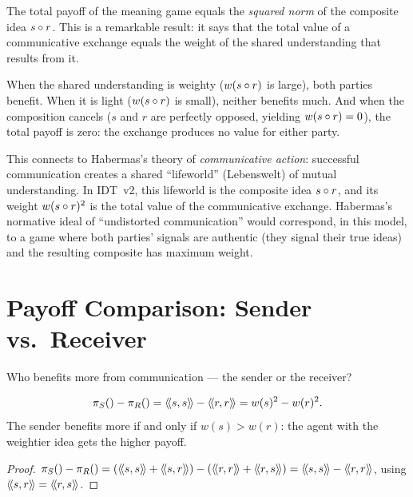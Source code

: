 \begin{interpretation}
\label{interp:total}
The total payoff of the meaning game equals the \emph{squared norm} of the
composite idea $s \circ r$. This is a remarkable result: it says that the
total value of a communicative exchange equals the weight of the shared
understanding that results from it.

When the shared understanding is weighty ($w(s \circ r)$ is large), both
parties benefit. When it is light ($w(s \circ r)$ is small), neither benefits
much. And when the composition cancels ($s$ and $r$ are perfectly opposed,
yielding $w(s \circ r) = 0$), the total payoff is zero: the exchange
produces no value for either party.

This connects to Habermas's theory of \emph{communicative action}: successful
communication creates a shared ``lifeworld'' (Lebenswelt) of mutual
understanding. In IDT~v2, this lifeworld is the composite idea $s \circ r$,
and its weight $w(s \circ r)^2$ is the total value of the communicative
exchange. Habermas's normative ideal of ``undistorted communication'' would
correspond, in this model, to a game where both parties' signals are authentic
(they signal their true ideas) and the resulting composite has maximum weight.
\end{interpretation}


\section{Payoff Comparison: Sender vs.\ Receiver}

Who benefits more from communication --- the sender or the receiver?

\begin{proposition}
\label{prop:payoff-diff}
\[
  \pi_{S}() - \pi_{R}() = \langle\!\langle s, s \rangle\!\rangle - \langle\!\langle r, r \rangle\!\rangle = w(s)^2 - w(r)^2.
\]
The sender benefits more if and only if $w(s) > w(r)$: the agent with the
weightier idea gets the higher payoff.
\end{proposition}

\begin{proof}
$\payoff{S}{} - \payoff{R}{} = (\rs{s}{s} + \rs{s}{r}) - (\rs{r}{r} + \rs{r}{s})
= \rs{s}{s} - \rs{r}{r}$, using $\langle\!\langle s, r \rangle\!\rangle = \langle\!\langle r, s \rangle\!\rangle$.
\end{proof}

